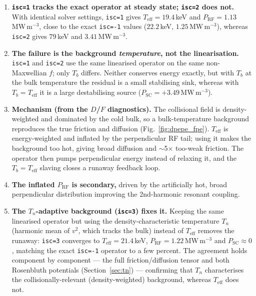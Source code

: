 \documentclass[11pt,a4paper]{article}
\begin{document}
\begin{enumerate}
  \item \textbf{\texttt{isc=1} tracks the exact operator at steady state;
        \texttt{isc=2} does not.} With identical solver settings,
        \texttt{isc=1} gives $T_\text{eff} = 19.4$\,keV and
        $P_\text{RF} = 1.13$\,MW\,m$^{-3}$, close to the exact
        \texttt{isc=-1} values ($22.2$\,keV, $1.25$\,MW\,m$^{-3}$), whereas
        \texttt{isc=2} gives $79$\,keV and $3.41$\,MW\,m$^{-3}$.

  \item \textbf{The failure is the background \emph{temperature}, not the
        linearisation.} \texttt{isc=1} and \texttt{isc=2} use the same
        linearised operator on the same non-Maxwellian $f$; only $T_b$
        differs. Neither conserves energy exactly, but with $T_b$ at the bulk
        temperature the residual is a small stabilising sink, whereas with
        $T_b = T_\text{eff}$ it is a large destabilising source
        ($P_\text{SC} = +3.49$\,MW\,m$^{-3}$).

  \item \textbf{Mechanism (from the $D$/$F$ diagnostics).} The collisional
        field is density-weighted and dominated by the cold bulk, so a
        bulk-temperature background reproduces the true friction and diffusion
        (Fig.~\ref{fig:dpepe_fpe}). $T_\text{eff}$ is energy-weighted and
        inflated by the perpendicular RF tail; using it makes the background
        too hot, giving broad diffusion and $\sim$5$\times$ too-weak friction.
        The operator then pumps perpendicular energy instead of relaxing it,
        and the $T_b = T_\text{eff}$ slaving closes a runaway feedback loop.

  \item \textbf{The inflated $P_\text{RF}$ is secondary,} driven by the
        artificially hot, broad perpendicular distribution improving the
        2nd-harmonic resonant coupling.

  \item \textbf{The $T_n$-adaptive background (\texttt{isc=3}) fixes it.}
        Keeping the same linearised operator but using the
        density-characteristic temperature $T_n$ (harmonic mean of $v^2$,
        which tracks the bulk) instead of $T_\text{eff}$ removes the runaway:
        \texttt{isc=3} converges to $T_\text{eff}=21.4$\,keV,
        $P_\text{RF}=1.22$\,MW\,m$^{-3}$ and $P_\text{SC}\approx0$, matching the
        exact \texttt{isc=-1} operator to a few percent. The agreement holds
        component by component --- the full friction/diffusion tensor and both
        Rosenbluth potentials (Section~\ref{sec:tn}) --- confirming that $T_n$
        characterises the collisionally-relevant (density-weighted) background,
        whereas $T_\text{eff}$ does not.


\end{enumerate}
\end{document}
